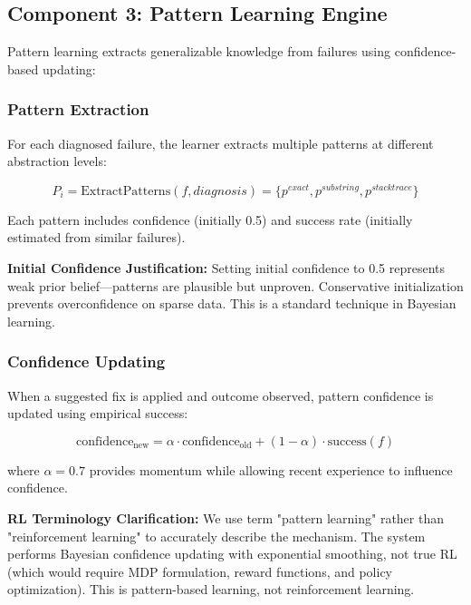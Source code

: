 \documentclass[11pt]{article}
\begin{document}
\subsection{Component 3: Pattern Learning Engine}

Pattern learning extracts generalizable knowledge from failures using confidence-based updating:

\subsubsection{Pattern Extraction}

For each diagnosed failure, the learner extracts multiple patterns at different abstraction levels:

\begin{equation}
P_i = \text{ExtractPatterns}(f, diagnosis) = \{p^{exact}, p^{substring}, p^{stacktrace}\}
\end{equation}

Each pattern includes confidence (initially 0.5) and success rate (initially estimated from similar failures).

\textbf{Initial Confidence Justification:} Setting initial confidence to 0.5 represents weak prior belief—patterns are plausible but unproven. Conservative initialization prevents overconfidence on sparse data. This is a standard technique in Bayesian learning.

\subsubsection{Confidence Updating}

When a suggested fix is applied and outcome observed, pattern confidence is updated using empirical success:

\begin{equation}
\text{confidence}_{\text{new}} = \alpha \cdot \text{confidence}_{\text{old}} + (1-\alpha) \cdot \text{success}(f)
\end{equation}

where $\alpha=0.7$ provides momentum while allowing recent experience to influence confidence.

\textbf{RL Terminology Clarification:} We use term "pattern learning" rather than "reinforcement learning" to accurately describe the mechanism. The system performs Bayesian confidence updating with exponential smoothing, not true RL (which would require MDP formulation, reward functions, and policy optimization). This is pattern-based learning, not reinforcement learning.
\end{document}
